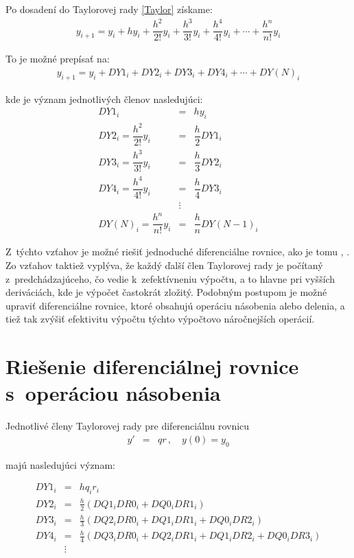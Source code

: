 Po dosadení do Taylorovej rady \eqref{Taylor} získame:
\begin{eqnarray}
y_{i + 1} = y_{i} + h y_{i} + \dfrac{h^{2}}{2!}y_{i} + \dfrac{h^{3}}{3!}y_{i} + \dfrac{h^{4}}{4!}y_{i} + \cdots + \dfrac{h^{n}}{n!}y_{i}
\end{eqnarray}


To je možné prepísať na:
\begin{eqnarray}
y_{i + 1} = y_{i} + DY1_{i} + DY2_{i} + DY3_{i} + DY4_{i} + \cdots + DY(N)_{i}
\end{eqnarray}

kde je význam jednotlivých členov nasledujúci:
\begin{eqnarray}
DY1_{i} & = & h y_{i} \label{DY_cleny} \\
DY2_{i} = \dfrac{h^{2}}{2!}y_{i} & = & \dfrac{h}{2} DY1_{i} \nonumber \\
DY3_{i} = \dfrac{h^{3}}{3!}y_{i} & = & \dfrac{h}{3} DY2_{i} \nonumber \\
DY4_{i} = \dfrac{h^{4}}{4!}y_{i} & = & \dfrac{h}{4} DY3_{i} \nonumber \\
& \vdots & \nonumber \\
DY(N)_{i} =  \dfrac{h^{n}}{n!}y_{i} & = & \dfrac{h}{n} DY(N-1)_{i} \nonumber
\end{eqnarray}

Z~týchto vzťahov je možné riešiť jednoduché diferenciálne rovnice, ako je tomu \cite{OpalkaBP}, \cite{KrausDisP}.
Zo vzťahov taktiež vyplýva, že každý ďalší člen Taylorovej rady je počítaný z~predchádzajúceho, čo vedie k~zefektívneniu výpočtu, a to hlavne pri vyšších deriváciách, kde je výpočet častokrát zložitý. Podobným postupom je možné upraviť diferenciálne rovnice, ktoré obsahujú operáciu násobenia alebo delenia, a tiež tak zvýšiť efektivitu výpočtu týchto výpočtovo náročnejších operácií. 


\section{Riešenie diferenciálnej rovnice s~operáciou násobenia}
Jednotlivé členy Taylorovej rady pre diferenciálnu rovnicu
\begin{eqnarray}
y' & = & qr \, , \quad y(0) = y_{0} \label{dif_nasobenie}
\end{eqnarray}

majú nasledujúci význam:

\begin{eqnarray}
DY1_{i} & = & hq_{i}r_{i} \label{DY1_cleny_nasobenia} \\
DY2_{i} & = & \frac{h}{2} (DQ1_{i}DR0_{i} + DQ0_{i}DR1_{i}) \label{DY2_cleny_nasobenia} \\
DY3_{i} & = & \frac{h}{3} (DQ2_{i}DR0_{i} + DQ1_{i}DR1_{i} + DQ0_{i}DR2_{i}) \label{DY3_cleny_nasobenia} \\
DY4_{i} & = & \frac{h}{4} (DQ3_{i}DR0_{i} + DQ2_{i}DR1_{i} + DQ1_{i}DR2_{i} + DQ0_{i}DR3_{i}) \label{DY4_cleny_nasobenia} \\
& \vdots \nonumber &
\end{eqnarray}

